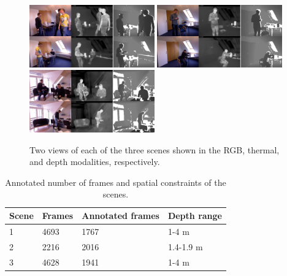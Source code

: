 \documentclass[10pt,twocolumn,letterpaper]{article}
\begin{document}
\begin{figure}[htbp]
	\centering
		\includegraphics[width=0.48\textwidth]{Selection/1.png}
		\includegraphics[width=0.48\textwidth]{Selection/2.png}
		\includegraphics[width=0.48\textwidth]{Selection/3.png}
	\caption{Two views of each of the three scenes shown in the RGB, thermal, and depth modalities, respectively.}
	\label{fig:samplescenes}
\end{figure}

\begin{table}[htpb]
\centering
\begin{tabular}{llll}
\hline
Scene & Frames 	& Annotated frames 	& Depth range \\ \hline
1 		& 4693		& 1767	 						& 1-4 m \\
2 		& 2216		& 2016	 						& 1.4-1.9 m \\
3 		& 4628		& 1941	 						& 1-4 m \\ 
\hline
\end{tabular}
\caption{Annotated number of frames and spatial constraints of the scenes.}
\label{tab:scenes}
\end{table}
\end{document}
